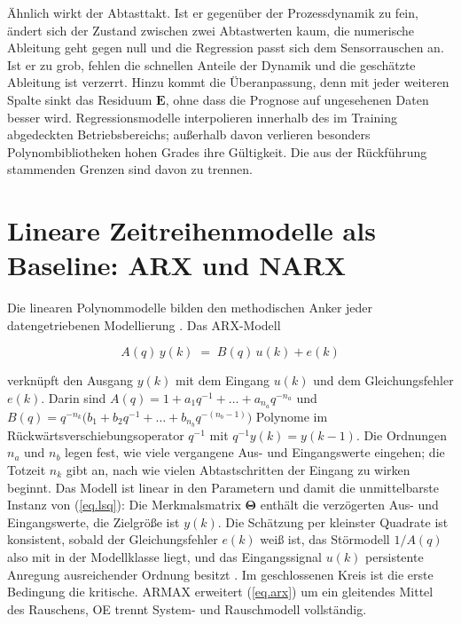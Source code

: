 Ähnlich wirkt der Abtasttakt. Ist er gegenüber der Prozessdynamik
zu fein, ändert sich der Zustand zwischen zwei Abtastwerten kaum, die
numerische Ableitung geht gegen null und die Regression passt sich dem
Sensorrauschen an. Ist er zu grob, fehlen die schnellen Anteile der Dynamik
und die geschätzte Ableitung ist verzerrt. Hinzu kommt die Überanpassung,
denn mit jeder weiteren Spalte sinkt das Residuum $\mathbf E$, ohne dass die
Prognose auf ungesehenen Daten besser wird. Regressionsmodelle interpolieren
innerhalb des im Training abgedeckten Betriebsbereichs; außerhalb davon
verlieren besonders Polynombibliotheken hohen Grades ihre Gültigkeit. Die
aus der Rückführung stammenden Grenzen sind davon zu trennen.


\section{Lineare Zeitreihenmodelle als Baseline: ARX und NARX}
\label{sec.sot.arx}

Die linearen Polynommodelle bilden den methodischen Anker jeder
datengetriebenen Modellierung \cite[Kap.~6]{isermannAutomotiveControlModeling2022}.
Das ARX-Modell

\begin{equation}
  \label{eq.arx}
  A(q)\,y(k) \;=\; B(q)\,u(k) + e(k)
\end{equation}

verknüpft den Ausgang $y(k)$ mit dem Eingang $u(k)$ und dem
Gleichungsfehler $e(k)$. Darin sind
$A(q) = 1 + a_1 q^{-1} + \dots + a_{n_a} q^{-n_a}$ und
$B(q) = q^{-n_k}\bigl(b_1 + b_2 q^{-1} + \dots + b_{n_b} q^{-(n_b-1)}\bigr)$
Polynome im Rückwärtsverschiebungsoperator $q^{-1}$ mit
$q^{-1}y(k) = y(k-1)$. Die Ordnungen $n_a$ und $n_b$ legen fest, wie
viele vergangene Aus- und Eingangswerte eingehen; die Totzeit $n_k$
gibt an, nach wie vielen Abtastschritten der Eingang zu wirken beginnt. Das Modell
ist linear in den Parametern und damit die unmittelbarste Instanz von
(\ref{eq.lsq}): Die Merkmalsmatrix $\boldsymbol\Theta$ enthält die
verzögerten Aus- und Eingangswerte, die Zielgröße ist $y(k)$. Die
Schätzung per kleinster Quadrate ist konsistent, sobald der
Gleichungsfehler $e(k)$ weiß ist, das Störmodell $1/A(q)$ also mit in
der Modellklasse liegt, und das Eingangssignal $u(k)$ persistente
Anregung ausreichender Ordnung besitzt
\cite[Kap.~8--9]{isermannAutomotiveControlModeling2022}. Im
geschlossenen Kreis ist die erste Bedingung die kritische. ARMAX erweitert (\ref{eq.arx}) um ein
gleitendes Mittel des Rauschens, OE trennt System- und Rauschmodell
vollständig.

